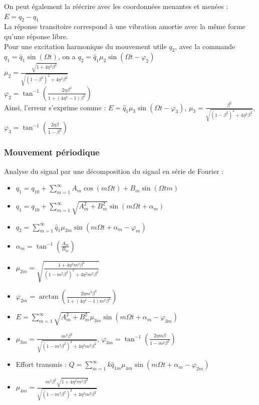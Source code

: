 \documentclass[../main.tex]{subfiles}
\begin{document}
On peut également la réécrire avec les coordonnées menantes et menées : $E = q_2-q_1$\\

La réponse transitoire correspond à une vibration amortie avec la même forme qu'une réponse libre.\\

Pour une excitation harmonique du mouvement utile $q_2$, avec la commande $q_1 = \hat{q}_1 \sin(\Omega t)$, on a $q_2 = \hat{q}_1 \mu_2 \sin(\Omega t-\varphi_2)$\\
$\mu_2 = \frac{\sqrt{1+4\eta^2 \beta^2}}{\sqrt{(1-\beta^2)^2 + 4\eta^2 \beta^2}}$\\
$\varphi_2 = \tan^{-1} (\frac{2\eta \beta^3}{1+(4\eta^2-1)\beta^2})$\\

Ainsi, l'erreur s'exprime comme : $E = \hat{q}_1 \mu_3 \sin(\Omega t-\varphi_3)$, $\mu_3 = \frac{\beta^2}{\sqrt{(1-\beta^2)^2 + 4\eta^2 \beta^2}}$, $\varphi_3 = \tan^{-1} (\frac{2\eta\beta}{1-\beta^2})$\\

\subsubsection{Mouvement périodique}
Analyse du signal par une décomposition du signal en série de Fourier : \begin{itemize}
    \item $q_1 = q_{10} + \sum_{m=1}^\infty A_m \cos(m\Omega t) + B_m \sin(\Omega t m)$\\
    \item $q_1 = q_{10} + \sum_{m=1}^\infty \sqrt{A_m^2 + B_m^2} \sin(m\Omega t + \alpha_m)$\\
    \item $q_2 = \sum_{m=1}^\infty \hat{q}_1 \mu_{2m} \sin(m\Omega t + \alpha_m - \varphi_m)$\\
    \item $\alpha_m = \tan^{-1} (\frac{A_m}{B_m})$\\
    \item $\mu_{2m} = \sqrt{\frac{1+4\eta^2m^2\beta^2}{(1-m^2\beta^2)^2 + 4\eta^2 m^2 \beta^2}}$\\
    \item $\varphi_{2m} = \arctan(\frac{2\eta m^3\beta^3}{1+(4\eta^2-1)m^2\beta^2})$\\
    \item $E = \sum_{m=1}^\infty \sqrt{A_m^2 + B_m^2} \mu_{3m} \sin(m\Omega t + \alpha_m - \varphi_{3m})$\\
    \item $\mu_{3m} = \frac{m^2 \beta^2}{\sqrt{(1-m^2\beta^2)^2 + 4\eta^2 m^2 \beta^2}}$, $\varphi_{3m} = \tan^{-1} (\frac{2\eta m \beta}{1-m^2 \beta^2})$\\
    \item Effort transmis : $Q = \sum_{m=1}^\infty k \hat{q}_{1m} \mu_{4m} \sin(m\Omega t + \alpha_m - \varphi_{2m})$\\
    \item $\mu_{4m} = \frac{m^2 \beta^2 \sqrt{1+4\eta^2m^2 \beta^2}}{\sqrt{(1-m^2 \beta^2)^2+4\eta^2 m^2 \beta^2}}$\\
\end{itemize}
\end{document}
